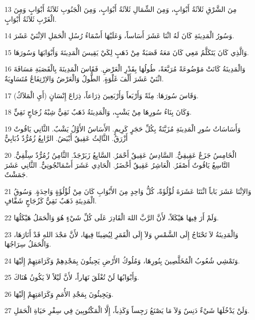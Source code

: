 \par 13 مِنَ الشَّرْقِ ثَلاَثَةُ أَبْوَابٍ، وَمِنَ الشِّمَالِ ثَلاَثَةُ أَبْوَابٍ، وَمِنَ الْجَنُوبِ ثَلاَثَةُ أَبْوَابٍ وَمِنَ الْغَرْبِ ثَلاَثَةُ أَبْوَابٍ.
\par 14 وَسُورُ الْمَدِينَةِ كَانَ لَهُ اثْنَا عَشَرَ أَسَاساً، وَعَلَيْهَا أَسْمَاءُ رُسُلِ الْحَمَلِ الاِثْنَيْ عَشَرَ.
\par 15 وَالَّذِي كَانَ يَتَكَلَّمُ مَعِي كَانَ مَعَهُ قَصَبَةٌ مِنْ ذَهَبٍ لِكَيْ يَقِيسَ الْمَدِينَةَ وَأَبْوَابَهَا وَسُورَهَا.
\par 16 وَالْمَدِينَةُ كَانَتْ مَوْضُوعَةً مُرَبَّعَةً، طُولُهَا بِقَدْرِ الْعَرْضِ. فَقَاسَ الْمَدِينَةَ بِالْقَصَبَةِ مَسَافَةَ اثْنَيْ عَشَرَ أَلْفَ غَلْوَةٍ. الطُّولُ وَالْعَرْضُ وَالاِرْتِفَاعُ مُتَسَاوِيَةٌ.
\par 17 وَقَاسَ سُورَهَا: مِئَةً وَأَرْبَعاً وَأَرْبَعِينَ ذِرَاعاً، ذِرَاعَ إِنْسَانٍ (أَيِ الْمَلاَكُ).
\par 18 وَكَانَ بِنَاءُ سُورِهَا مِنْ يَشْبٍ، وَالْمَدِينَةُ ذَهَبٌ نَقِيٌّ شِبْهُ زُجَاجٍ نَقِيٍّ.
\par 19 وَأَسَاسَاتُ سُورِ الْمَدِينَةِ مُزَيَّنَةٌ بِكُلِّ حَجَرٍ كَرِيمٍ. الأَسَاسُ الأَوَّلُ يَشْبٌ. الثَّانِي يَاقُوتٌ أَزْرَقُ. الثَّالِثُ عَقِيقٌ أَبْيَضُ. الرَّابِعُ زُمُرُّدٌ ذُبَابِيٌّ
\par 20 الْخَامِسُ جَزَعٌ عَقِيقِيٌّ. السَّادِسُ عَقِيقٌ أَحْمَرُ. السَّابِعُ زَبَرْجَدٌ. الثَّامِنُ زُمُرُّدٌ سِلْقِيٌّ. التَّاسِعُ يَاقُوتٌ أَصْفَرُ. الْعَاشِرُ عَقِيقٌ أَخْضَرُ. الْحَادِي عَشَرَ أَسْمَانْجُونِيٌّ. الثَّانِي عَشَرَ جَمَشْتٌ.
\par 21 وَالاِثْنَا عَشَرَ بَاباً اثْنَتَا عَشَرَةَ لُؤْلُؤَةً، كُلُّ وَاحِدٍ مِنَ الأَبْوَابِ كَانَ مِنْ لُؤْلُؤَةٍ وَاحِدَةٍ. وَسُوقُ الْمَدِينَةِ ذَهَبٌ نَقِيٌّ كَزُجَاجٍ شَفَّافٍ.
\par 22 وَلَمْ أَرَ فِيهَا هَيْكَلاً، لأَنَّ الرَّبَّ اللهَ الْقَادِرَ عَلَى كُلِّ شَيْءٍ هُوَ وَالْحَمَلُ هَيْكَلُهَا.
\par 23 وَالْمَدِينَةُ لاَ تَحْتَاجُ إِلَى الشَّمْسِ وَلاَ إِلَى الْقَمَرِ لِيُضِيئَا فِيهَا، لأَنَّ مَجْدَ اللهِ قَدْ أَنَارَهَا، وَالْحَمَلُ سِرَاجُهَا.
\par 24 وَتَمْشِي شُعُوبُ الْمُخَلَّصِينَ بِنُورِهَا، وَمُلُوكُ الأَرْضِ يَجِيئُونَ بِمَجْدِهِمْ وَكَرَامَتِهِمْ إِلَيْهَا.
\par 25 وَأَبْوَابُهَا لَنْ تُغْلَقَ نَهَاراً، لأَنَّ لَيْلاً لاَ يَكُونُ هُنَاكَ.
\par 26 وَيَجِيئُونَ بِمَجْدِ الأُمَمِ وَكَرَامَتِهِمْ إِلَيْهَا.
\par 27 وَلَنْ يَدْخُلَهَا شَيْءٌ دَنِسٌ وَلاَ مَا يَصْنَعُ رَجِساً وَكَذِباً، إِلَّا الْمَكْتُوبِينَ فِي سِفْرِ حَيَاةِ الْحَمَلِ.

